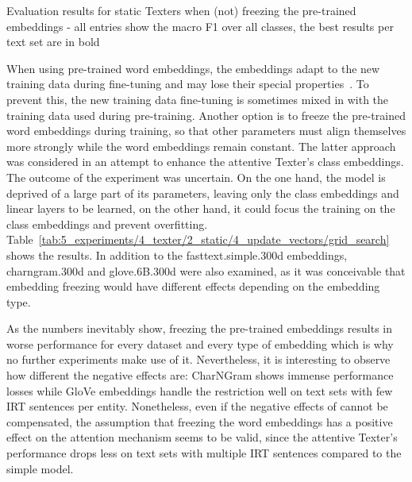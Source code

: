 \begin{table}
    \centering
    
    \caption{Evaluation results for static Texters when (not) freezing the pre-trained embeddings - all entries show the macro F1 over all classes, the best results per text set are in bold}
    \label{tab:5_experiments/4_texter/2_static/4_update_vectors/grid_search}
\end{table}

When using pre-trained word embeddings, the embeddings adapt to the new training data during fine-tuning and may lose their special properties~\cite{He2019AnalyzingTF}. To prevent this, the new training data fine-tuning is sometimes mixed in with the training data used during pre-training. Another option is to freeze the pre-trained word embeddings during training, so that other parameters must align themselves more strongly while the word embeddings remain constant. The latter approach was considered in an attempt to enhance the attentive Texter's class embeddings. The outcome of the experiment was uncertain. On the one hand, the model is deprived of a large part of its parameters, leaving only the class embeddings and linear layers to be learned, on the other hand, it could focus the training on the class embeddings and prevent overfitting. Table~\ref{tab:5_experiments/4_texter/2_static/4_update_vectors/grid_search} shows the results. In addition to the fasttext.simple.300d embeddings, charngram.300d and glove.6B.300d were also examined, as it was conceivable that embedding freezing would have different effects depending on the embedding type.

As the numbers inevitably show, freezing the pre-trained embeddings results in worse performance for every dataset and every type of embedding which is why no further experiments make use of it. Nevertheless, it is interesting to observe how different the negative effects are: CharNGram shows immense performance losses while GloVe embeddings handle the restriction well on text sets with few IRT sentences per entity. Nonetheless, even if the negative effects of cannot be compensated, the assumption that freezing the word embeddings has a positive effect on the attention mechanism seems to be valid, since the attentive Texter's performance drops less on text sets with multiple IRT sentences compared to the simple model.
